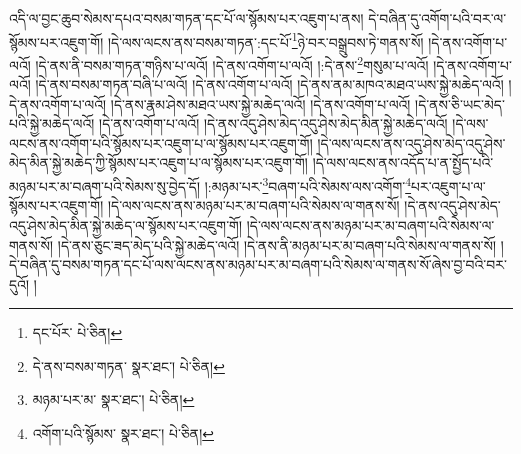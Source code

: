 འདི་ལ་བྱང་ཆུབ་སེམས་དཔའ་བསམ་གཏན་དང་པོ་ལ་སྙོམས་པར་འཇུག་པ་ནས། དེ་བཞིན་དུ་འགོག་པའི་བར་ལ་སྙོམས་པར་འཇུག་གོ། །དེ་ལས་ལངས་ནས་བསམ་གཏན་:དང་པོ་\footnote{དང་པོར་  པེ་ཅིན། }ཉེ་བར་བསྒྲུབས་ཏེ་གནས་སོ། །དེ་ནས་འགོག་པ་ལའོ། །དེ་ནས་ནི་བསམ་གཏན་གཉིས་པ་ལའོ། །དེ་ནས་འགོག་པ་ལའོ། །:དེ་ནས་\footnote{དེ་ནས་བསམ་གཏན་  སྣར་ཐང་།  པེ་ཅིན། }གསུམ་པ་ལའོ། །དེ་ནས་འགོག་པ་ལའོ། །དེ་ནས་བསམ་གཏན་བཞི་པ་ལའོ། །དེ་ནས་འགོག་པ་ལའོ། །དེ་ནས་ནམ་མཁའ་མཐའ་ཡས་སྐྱེ་མཆེད་ལའོ། །དེ་ནས་འགོག་པ་ལའོ། །དེ་ནས་རྣམ་ཤེས་མཐའ་ཡས་སྐྱེ་མཆེད་ལའོ། །དེ་ནས་འགོག་པ་ལའོ། །དེ་ནས་ཅི་ཡང་མེད་པའི་སྐྱེ་མཆེད་ལའོ། །དེ་ནས་འགོག་པ་ལའོ། །དེ་ནས་འདུ་ཤེས་མེད་འདུ་ཤེས་མེད་མིན་སྐྱེ་མཆེད་ལའོ། །དེ་ལས་ལངས་ནས་འགོག་པའི་སྙོམས་པར་འཇུག་པ་ལ་སྙོམས་པར་འཇུག་གོ། །དེ་ལས་ལངས་ནས་འདུ་ཤེས་མེད་འདུ་ཤེས་མེད་མིན་སྐྱེ་མཆེད་ཀྱི་སྙོམས་པར་འཇུག་པ་ལ་སྙོམས་པར་འཇུག་གོ། །དེ་ལས་ལངས་ནས་འདོད་པ་ན་སྤྱོད་པའི་མཉམ་པར་མ་བཞག་པའི་སེམས་སུ་བྱེད་དོ། །:མཉམ་པར་\footnote{མཉམ་པར་མ་  སྣར་ཐང་།  པེ་ཅིན། }བཞག་པའི་སེམས་ལས་འགོག་\footnote{འགོག་པའི་སྙོམས་  སྣར་ཐང་།  པེ་ཅིན། }པར་འཇུག་པ་ལ་སྙོམས་པར་འཇུག་གོ། །དེ་ལས་ལངས་ནས་མཉམ་པར་མ་བཞག་པའི་སེམས་ལ་གནས་སོ། །དེ་ནས་འདུ་ཤེས་མེད་འདུ་ཤེས་མེད་མིན་སྐྱེ་མཆེད་ལ་སྙོམས་པར་འཇུག་གོ། །དེ་ལས་ལངས་ནས་མཉམ་པར་མ་བཞག་པའི་སེམས་ལ་གནས་སོ། །དེ་ནས་ཅུང་ཟད་མེད་པའི་སྐྱེ་མཆེད་ལའོ། །དེ་ནས་ནི་མཉམ་པར་མ་བཞག་པའི་སེམས་ལ་གནས་སོ། །དེ་བཞིན་དུ་བསམ་གཏན་དང་པོ་ལས་ལངས་ནས་མཉམ་པར་མ་བཞག་པའི་སེམས་ལ་གནས་སོ་ཞེས་བྱ་བའི་བར་དུའོ། །
